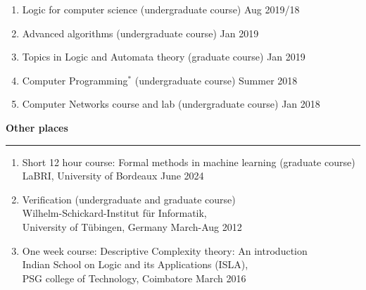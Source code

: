 \documentclass[margin]{res}
\begin{document}
\begin{resume}
\begin{enumerate}
					\item {Logic for computer science} (undergraduate course) \hfill Aug 2019/18
					\item {Advanced algorithms} (undergraduate course) \hfill Jan 2019
					\item {Topics in Logic and Automata theory} (graduate course) \hfill Jan 2019
					\item {Computer Programming$^*$} (undergraduate course)  \hfill Summer 2018
					\item {Computer Networks course and lab} (undergraduate course)  \hfill Jan 2018
					\end{enumerate}
					
					{\bf Other places} \\
					\noindent\rule{13cm}{0.4pt}
					\begin{enumerate}
					\item Short 12 hour course: {Formal methods in machine learning} (graduate course) \\
					LaBRI, University of Bordeaux \hfill June 2024
					\item {Verification}  (undergraduate and graduate course)  \\
					Wilhelm-Schickard-Institut f\"ur Informatik, \\
					University of T\"ubingen, Germany \hfill March-Aug 2012
					\item One week course: {Descriptive Complexity theory: An introduction}  \\
					Indian School on Logic and its Applications (ISLA), \\
					PSG college of Technology, Coimbatore \hfill March 2016
					\end{enumerate}
									


\end{resume}
\end{document}
